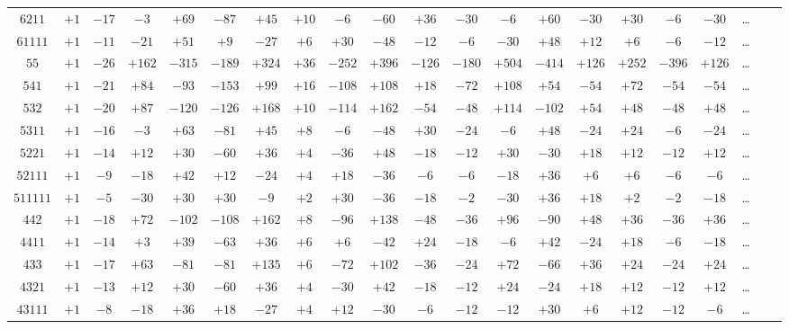 \documentclass[11pt,a4paper]{book}
\begin{document}
\begin{center}
\begin{tabular}{c|c|c|c|c|c|c|c|c|c|c|c|c|c|c|c|c|c|c|c|c}
$6211$ & $+1$ & $-17$ & $-3$ & $+69$ & $-87$ & $+45$ & $+10$ & $-6$ & $-60$ & $+36$ & $-30$ & $-6$ & $+60$ & $-30$ & $+30$ & $-6$ & $-30$ & \dots \\
$61111$ & $+1$ & $-11$ & $-21$ & $+51$ & $+9$ & $-27$ & $+6$ & $+30$ & $-48$ & $-12$ & $-6$ & $-30$ & $+48$ & $+12$ & $+6$ & $-6$ & $-12$ & \dots \\
$55$ & $+1$ & $-26$ & $+162$ & $-315$ & $-189$ & $+324$ & $+36$ & $-252$ & $+396$ & $-126$ & $-180$ & $+504$ & $-414$ & $+126$ & $+252$ & $-396$ & $+126$ & \dots \\
$541$ & $+1$ & $-21$ & $+84$ & $-93$ & $-153$ & $+99$ & $+16$ & $-108$ & $+108$ & $+18$ & $-72$ & $+108$ & $+54$ & $-54$ & $+72$ & $-54$ & $-54$ & \dots \\
$532$ & $+1$ & $-20$ & $+87$ & $-120$ & $-126$ & $+168$ & $+10$ & $-114$ & $+162$ & $-54$ & $-48$ & $+114$ & $-102$ & $+54$ & $+48$ & $-48$ & $+48$ & \dots \\
$5311$ & $+1$ & $-16$ & $-3$ & $+63$ & $-81$ & $+45$ & $+8$ & $-6$ & $-48$ & $+30$ & $-24$ & $-6$ & $+48$ & $-24$ & $+24$ & $-6$ & $-24$ & \dots \\
$5221$ & $+1$ & $-14$ & $+12$ & $+30$ & $-60$ & $+36$ & $+4$ & $-36$ & $+48$ & $-18$ & $-12$ & $+30$ & $-30$ & $+18$ & $+12$ & $-12$ & $+12$ & \dots \\
$52111$ & $+1$ & $-9$ & $-18$ & $+42$ & $+12$ & $-24$ & $+4$ & $+18$ & $-36$ & $-6$ & $-6$ & $-18$ & $+36$ & $+6$ & $+6$ & $-6$ & $-6$ & \dots \\
$511111$ & $+1$ & $-5$ & $-30$ & $+30$ & $+30$ & $-9$ & $+2$ & $+30$ & $-36$ & $-18$ & $-2$ & $-30$ & $+36$ & $+18$ & $+2$ & $-2$ & $-18$ & \dots \\
$442$ & $+1$ & $-18$ & $+72$ & $-102$ & $-108$ & $+162$ & $+8$ & $-96$ & $+138$ & $-48$ & $-36$ & $+96$ & $-90$ & $+48$ & $+36$ & $-36$ & $+36$ & \dots \\
$4411$ & $+1$ & $-14$ & $+3$ & $+39$ & $-63$ & $+36$ & $+6$ & $+6$ & $-42$ & $+24$ & $-18$ & $-6$ & $+42$ & $-24$ & $+18$ & $-6$ & $-18$ & \dots \\
$433$ & $+1$ & $-17$ & $+63$ & $-81$ & $-81$ & $+135$ & $+6$ & $-72$ & $+102$ & $-36$ & $-24$ & $+72$ & $-66$ & $+36$ & $+24$ & $-24$ & $+24$ & \dots \\
$4321$ & $+1$ & $-13$ & $+12$ & $+30$ & $-60$ & $+36$ & $+4$ & $-30$ & $+42$ & $-18$ & $-12$ & $+24$ & $-24$ & $+18$ & $+12$ & $-12$ & $+12$ & \dots \\
$43111$ & $+1$ & $-8$ & $-18$ & $+36$ & $+18$ & $-27$ & $+4$ & $+12$ & $-30$ & $-6$ & $-12$ & $-12$ & $+30$ & $+6$ & $+12$ & $-12$ & $-6$ & \dots \\

\end{tabular}
\end{center}
\end{document}
